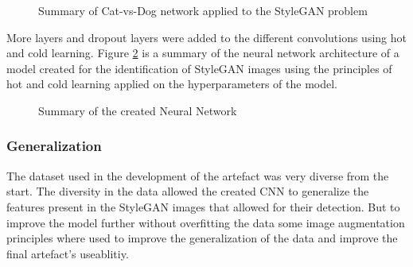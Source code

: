 \begin{figure}[H]%
\centering
{}%
\caption{Summary of Cat-vs-Dog network applied to the StyleGAN problem}%
\label{fig:nn1}%
\end{figure}

More layers and dropout layers were added to the different convolutions using hot and cold learning. Figure \ref{fig:nn2} is a summary of the neural network architecture of a model created for the identification of StyleGAN images using the principles of hot and cold learning applied on the hyperparameters of the model.  

\begin{figure}[H]%
\centering
{}%
\caption{Summary of the created Neural Network}%
\label{fig:nn2}%
\end{figure}

\subsubsection{Generalization}

The dataset used in the development of the artefact was very diverse from the start. The diversity in the data allowed the created CNN to generalize the features present in the StyleGAN images that allowed for their detection. But to improve the model further without overfitting the data some image augmentation principles where used to improve the generalization of the data and improve the final artefact's useablitiy.

